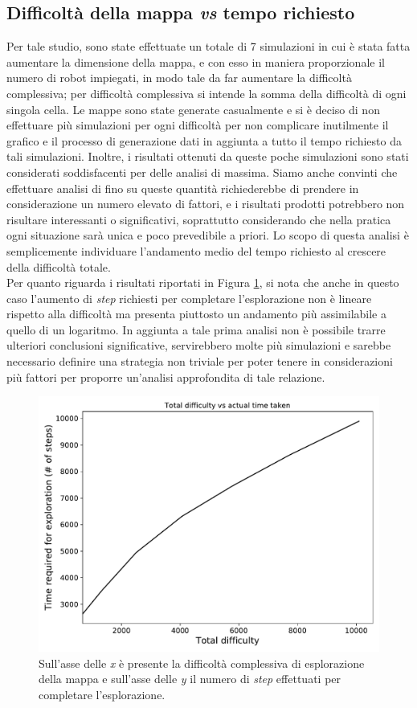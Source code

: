 \subsection{Difficoltà della mappa \textit{vs} tempo richiesto}
Per tale studio, sono state effettuate un totale di 7 simulazioni in cui è stata fatta aumentare la dimensione della mappa, e con esso in maniera proporzionale il numero di robot impiegati, in modo tale da far aumentare la difficoltà complessiva; per difficoltà complessiva si intende la somma della difficoltà di ogni singola cella.
Le mappe sono state generate casualmente e si è deciso di non effettuare più simulazioni per ogni difficoltà per non complicare inutilmente il grafico e il processo di generazione dati in aggiunta a tutto il tempo richiesto da tali simulazioni. Inoltre, i risultati ottenuti da queste poche simulazioni sono stati considerati soddisfacenti per delle analisi di massima.
Siamo anche convinti che effettuare analisi di fino su queste quantità richiederebbe di prendere in considerazione un numero elevato di fattori, e i risultati prodotti potrebbero non risultare interessanti o significativi, soprattutto considerando che nella pratica ogni situazione sarà unica e poco prevedibile a priori. Lo scopo di questa analisi è semplicemente individuare l'andamento medio del tempo richiesto al crescere della difficoltà totale.\\
Per quanto riguarda i risultati riportati in Figura \ref{fig:difficulty}, si nota che anche in questo caso l'aumento di \textit{step} richiesti per completare l'esplorazione non è lineare rispetto alla difficoltà ma presenta piuttosto un andamento più assimilabile a quello di un logaritmo.
In aggiunta a tale prima analisi non è possibile trarre ulteriori conclusioni significative, servirebbero molte più simulazioni e sarebbe necessario definire una strategia non triviale per poter tenere in considerazioni più fattori per proporre un'analisi approfondita di tale relazione.
\begin{figure}
	\centering
	\includegraphics[width=0.9\linewidth]{images/macro_results/difficulty}
	\caption{Sull'asse delle \textit{x} è presente la difficoltà complessiva di esplorazione della mappa e sull'asse delle \textit{y} il numero di \textit{step} effettuati per completare l'esplorazione.}
	\label{fig:difficulty}
\end{figure}
\newpage